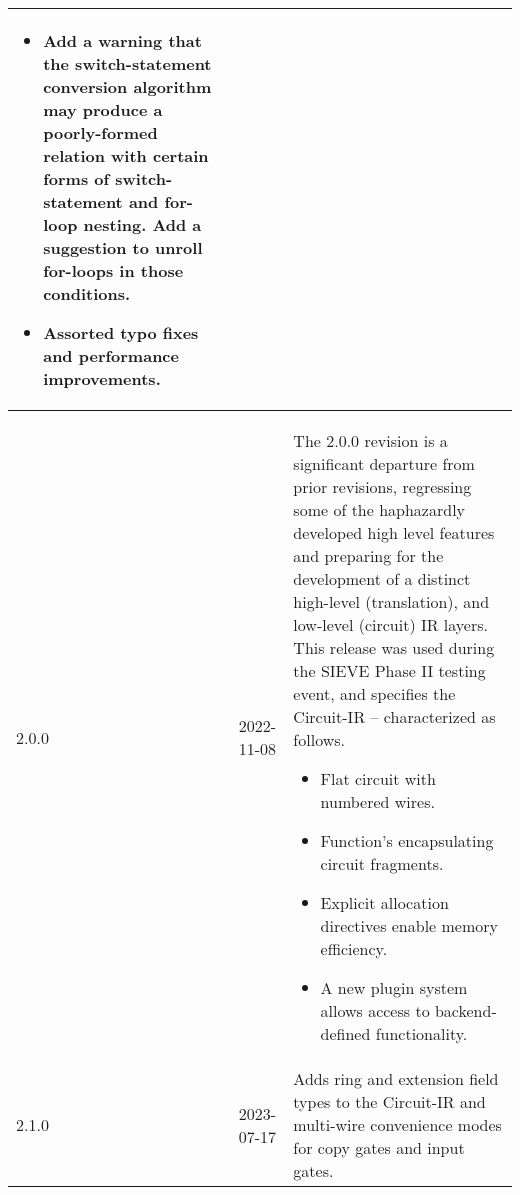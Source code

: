 \documentclass[12pt]{article}
\begin{document}
\begin{tabularx}{\textwidth}{|p{1in}|p{1in}|p{4in}|}
\begin{itemize}
    \item Add a warning that the switch-statement conversion algorithm may produce a poorly-formed relation with certain forms of switch-statement and for-loop nesting. Add a suggestion to unroll for-loops in those conditions.
    \item Assorted typo fixes and performance improvements.
  \end{itemize} \\
  \hline
  2.0.0            & 2022-11-08    & The 2.0.0 revision is a significant departure from prior revisions, regressing some of the haphazardly developed high level features and preparing for the development of a distinct high-level (translation), and low-level (circuit) IR layers.
  This release was used during the SIEVE Phase II testing event, and specifies the Circuit-IR -- characterized as follows.
  \begin{itemize}
    \item Flat circuit with numbered wires.
    \item Function's encapsulating circuit fragments.
    \item Explicit allocation directives enable memory efficiency.
    \item A new plugin system allows access to backend-defined functionality.
  \end{itemize} \\
  \hline
  2.1.0            & 2023-07-17    & Adds ring and extension field types to the Circuit-IR and multi-wire convenience modes for copy gates and input gates. \\
  \hline
\end{tabularx}

\newpage
\tableofcontents
\newpage





\end{document}
